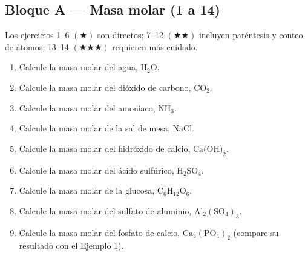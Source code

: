 \documentclass[12pt, letterpaper]{article}
\begin{document}
\subsection{Bloque A — Masa molar (1 a 14)}

\noindent Los ejercicios 1--6 $(\bigstar)$ son directos; 7--12 $(\bigstar\bigstar)$ incluyen paréntesis y conteo de átomos; 13--14 $(\bigstar\bigstar\bigstar)$ requieren más cuidado.

\begin{enumerate}[leftmargin=*, start=1]

  \item \facil{}\hspace{0.55em}Calcule la masa molar del agua, $\text{H}_2\text{O}$.

  \item \facil{}\hspace{0.55em}Calcule la masa molar del dióxido de carbono, $\text{CO}_2$.

  \item \facil{}\hspace{0.55em}Calcule la masa molar del amoniaco, $\text{NH}_3$.

  \item \facil{}\hspace{0.55em}Calcule la masa molar de la sal de mesa, $\text{NaCl}$.

  \item \facil{}\hspace{0.55em}Calcule la masa molar del hidróxido de calcio, $\text{Ca(OH)}_2$.

  \item \facil{}\hspace{0.55em}Calcule la masa molar del ácido sulfúrico, $\text{H}_2\text{SO}_4$.

  \item \medio{}\hspace{0.55em}Calcule la masa molar de la glucosa, $\text{C}_6\text{H}_{12}\text{O}_6$.

  \item \medio{}\hspace{0.55em}Calcule la masa molar del sulfato de aluminio, $\text{Al}_2(\text{SO}_4)_3$.

  \item \medio{}\hspace{0.55em}Calcule la masa molar del fosfato de calcio, $\text{Ca}_3(\text{PO}_4)_2$ (compare su resultado con el Ejemplo 1).


\end{enumerate}
\end{document}
